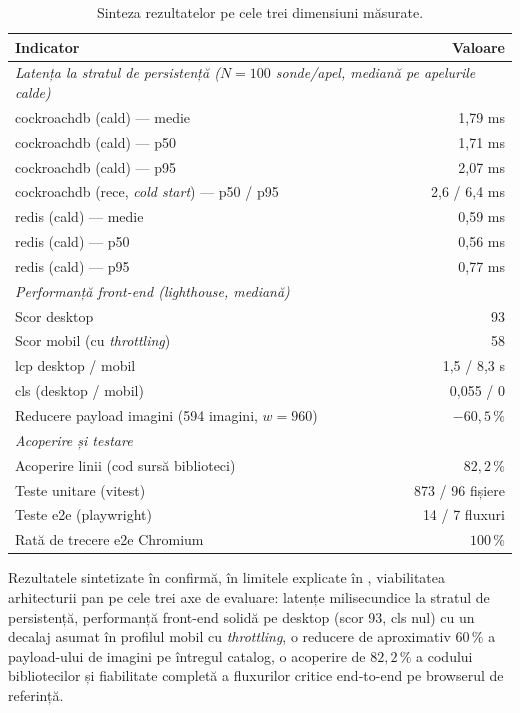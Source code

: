 \begin{table}[htbp]
\centering
\caption{Sinteza rezultatelor pe cele trei dimensiuni măsurate.}
\label{tab:rezultate}
\begin{tabular}{lr}
\toprule
\textbf{Indicator} & \textbf{Valoare} \\
\midrule
\multicolumn{2}{l}{\textit{Latența la stratul de persistență (\(N=100\) sonde/apel, mediană pe apelurile calde)}} \\
\quad \gls{cockroachdb} (cald) --- medie & 1,79 ms \\
\quad \gls{cockroachdb} (cald) --- \acrshort{p50} & 1,71 ms \\
\quad \gls{cockroachdb} (cald) --- \acrshort{p95} & 2,07 ms \\
\quad \gls{cockroachdb} (rece, \textit{cold start}) --- \acrshort{p50} / \acrshort{p95} & 2,6 / 6,4 ms \\
\quad \gls{redis} (cald) --- medie & 0,59 ms \\
\quad \gls{redis} (cald) --- \acrshort{p50} & 0,56 ms \\
\quad \gls{redis} (cald) --- \acrshort{p95} & 0,77 ms \\
\midrule
\multicolumn{2}{l}{\textit{Performanță front-end (\gls{lighthouse}, mediană)}} \\
\quad Scor desktop & 93 \\
\quad Scor mobil (cu \textit{throttling}) & 58 \\
\quad \acrshort{lcp} desktop / mobil & 1,5 / 8,3 s \\
\quad \acrshort{cls} (desktop / mobil) & 0,055 / 0 \\
\quad Reducere payload imagini (594 imagini, \(w=960\)) & \(-60{,}5\,\%\) \\
\midrule
\multicolumn{2}{l}{\textit{Acoperire și testare}} \\
\quad Acoperire linii (cod sursă biblioteci) & \(82{,}2\,\%\) \\
\quad Teste unitare (\gls{vitest}) & 873 / 96 fișiere \\
\quad Teste \acrshort{e2e} (\gls{playwright}) & 14 / 7 fluxuri \\
\quad Rată de trecere \acrshort{e2e} Chromium & \(100\,\%\) \\
\bottomrule
\end{tabular}
\end{table}

Rezultatele sintetizate în  confirmă, în limitele explicate în , viabilitatea arhitecturii \gls{pan} pe cele trei axe de evaluare: latențe milisecundice la stratul de persistență, performanță front-end solidă pe desktop (scor 93, \gls{cls} nul) cu un decalaj asumat în profilul mobil cu \textit{throttling}, o reducere de aproximativ \(60\,\%\) a payload-ului de imagini pe întregul catalog, o acoperire de \(82{,}2\,\%\) a codului bibliotecilor și fiabilitate completă a fluxurilor critice end-to-end pe browserul de referință.

